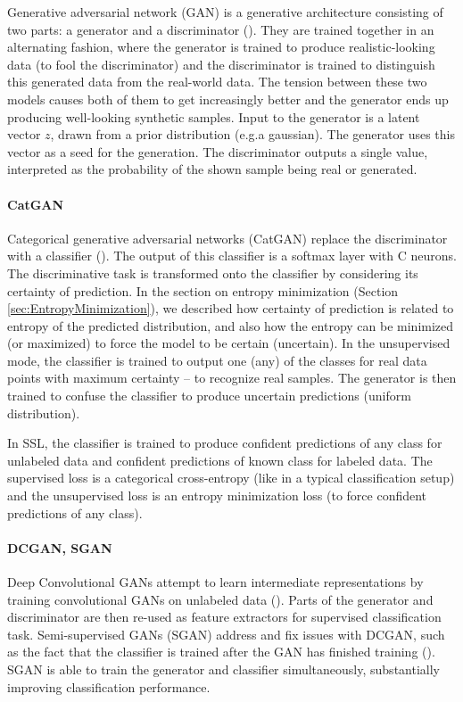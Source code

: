 Generative adversarial network (GAN) is a generative architecture consisting of two parts: a generator and a discriminator (\cite{GAN}). They are trained together in an alternating fashion, where the generator is trained to produce realistic-looking data (to fool the discriminator) and the discriminator is trained to distinguish this generated data from the real-world data. The tension between these two models causes both of them to get increasingly better and the generator ends up producing well-looking synthetic samples. Input to the generator is a latent vector $z$, drawn from a prior distribution (e.g.\@ a gaussian). The generator uses this vector as a seed for the generation. The discriminator outputs a single value, interpreted as the probability of the shown sample being real or generated.

\paragraph*{CatGAN}
Categorical generative adversarial networks (CatGAN) replace the discriminator with a classifier (\cite{CatGAN}). The output of this classifier is a softmax layer with C neurons. The discriminative task is transformed onto the classifier by considering its certainty of prediction. In the section on entropy minimization (Section \ref{sec:EntropyMinimization}), we described how certainty of prediction is related to entropy of the predicted distribution, and also how the entropy can be minimized (or maximized) to force the model to be certain (uncertain). In the unsupervised mode, the classifier is trained to output one (any) of the classes for real data points with maximum certainty -- to recognize real samples. The generator is then trained to confuse the classifier to produce uncertain predictions (uniform distribution).

In SSL, the classifier is trained to produce confident predictions of any class for unlabeled data and confident predictions of known class for labeled data. The supervised loss is a categorical cross-entropy (like in a typical classification setup) and the unsupervised loss is an entropy minimization loss (to force confident predictions of any class).

\paragraph*{DCGAN, SGAN}
Deep Convolutional GANs attempt to learn intermediate representations by training convolutional GANs on unlabeled data (\cite{DCGAN}). Parts of the generator and discriminator are then re-used as feature extractors for supervised classification task. Semi-supervised GANs (SGAN) address and fix issues with DCGAN, such as the fact that the classifier is trained after the GAN has finished training (\cite{SGAN}). SGAN is able to train the generator and classifier simultaneously, substantially improving classification performance.

